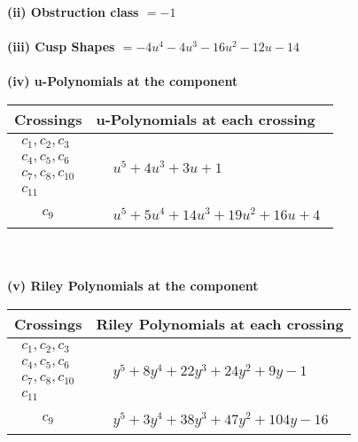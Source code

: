 \documentclass[1p]{elsarticle_modified}
\theoremstyle{definition}
\begin{document}
\flushleft \textbf{(ii) Obstruction class $= -1$}\\~\\
\flushleft \textbf{(iii) Cusp Shapes $= -4 u^4-4 u^3-16 u^2-12 u-14$}\\~\\
\newpage\renewcommand{\arraystretch}{1}
\flushleft \textbf{(iv) u-Polynomials at the component}\newline \\
\begin{tabular}{m{50pt}|m{274pt}}
Crossings & \hspace{64pt}u-Polynomials at each crossing \\
\hline $$\begin{aligned}c_{1},c_{2},c_{3}\\c_{4},c_{5},c_{6}\\c_{7},c_{8},c_{10}\\c_{11}\end{aligned}$$&$\begin{aligned}
&u^5+4 u^3+3 u+1
\end{aligned}$\\
\hline $$\begin{aligned}c_{9}\end{aligned}$$&$\begin{aligned}
&u^5+5 u^4+14 u^3+19 u^2+16 u+4
\end{aligned}$\\
\hline
\end{tabular}\\~\\
\newpage\renewcommand{\arraystretch}{1}
\flushleft \textbf{(v) Riley Polynomials at the component}\newline \\
\begin{tabular}{m{50pt}|m{274pt}}
Crossings & \hspace{64pt}Riley Polynomials at each crossing \\
\hline $$\begin{aligned}c_{1},c_{2},c_{3}\\c_{4},c_{5},c_{6}\\c_{7},c_{8},c_{10}\\c_{11}\end{aligned}$$&$\begin{aligned}
&y^5+8 y^4+22 y^3+24 y^2+9 y-1
\end{aligned}$\\
\hline $$\begin{aligned}c_{9}\end{aligned}$$&$\begin{aligned}
&y^5+3 y^4+38 y^3+47 y^2+104 y-16
\end{aligned}$\\
\hline
\end{tabular}\\~\\
\end{document}
